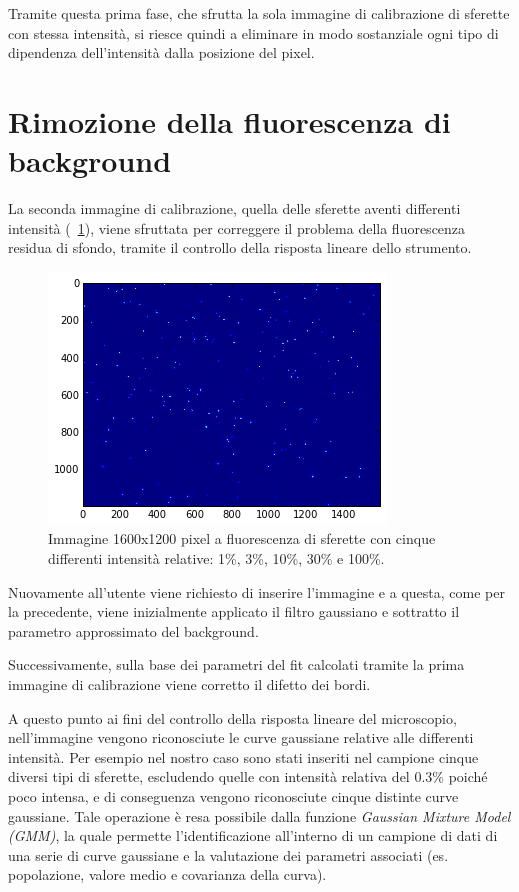 Tramite questa prima fase, che sfrutta la sola immagine di calibrazione di sferette con stessa intensità, si riesce quindi a eliminare in modo sostanziale ogni tipo di dipendenza dell'intensità dalla posizione del pixel. 

\section{Rimozione della fluorescenza di background}

La seconda immagine di calibrazione, quella delle sferette aventi differenti intensità (\figurename~\ref{fig:piuint}), viene sfruttata per correggere il problema della fluorescenza residua di sfondo, tramite il controllo della risposta lineare dello strumento. 

\begin{figure}
 \centering
 \includegraphics[scale=1]{img/CAP3piuint.png}
 \caption{\small{Immagine 1600x1200 pixel a fluorescenza di sferette con cinque differenti intensità relative: 1\%, 3\%, 10\%, 30\% e 100\%.}}
 \label{fig:piuint}
\end{figure}

Nuovamente all'utente viene richiesto di inserire l'immagine e a questa, come per la precedente, viene inizialmente applicato il filtro gaussiano e sottratto il parametro approssimato del background. 

Successivamente, sulla base dei parametri del fit calcolati tramite la prima immagine di calibrazione viene corretto il difetto dei bordi.

A questo punto ai fini del controllo della risposta lineare del microscopio,  nell'immagine vengono riconosciute le curve gaussiane relative alle differenti intensità. 
Per esempio nel nostro caso sono stati inseriti nel campione cinque diversi tipi di sferette, escludendo quelle con intensità relativa del 0.3\% poiché poco intensa, e di conseguenza vengono riconosciute cinque distinte curve gaussiane.
Tale operazione è resa possibile dalla funzione \textit{Gaussian Mixture Model (GMM)}, la quale permette l'identificazione all'interno di un campione di dati di una serie di curve gaussiane e la valutazione dei parametri associati (es. popolazione, valore medio e covarianza della curva).

